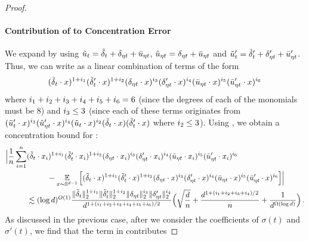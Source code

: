 \begin{proof}
\paragraph{Contribution of  to Concentration Error} We expand  by using $\tilde{u}_t = {\tilde{\delta}}_t + \delta_{\eta t} + \bar{u}_{\eta t}$, $\hat{u}_{\eta t} = \delta_{\eta t} + \bar{u}_{\eta t}$ and $\tilde{u}_t' = {\tilde{\delta}}_t' + \delta_{\eta t}' + \bar{u}_{\eta t}'$. Thus, we can write  as a linear combination of terms of the form
\begin{align} \label{eq:single_term_type1_simplified}
({\tilde{\delta}}_t \cdot x)^{1 + i_{1}} ({\tilde{\delta}}_t' \cdot x)^{1 + i_{2}} (\delta_{\eta t} \cdot x)^{i_{3}} (\delta_{\eta t}' \cdot x)^{i_{4}} (\bar{u}_{\eta t} \cdot x)^{i_{5}} (\bar{u}_{\eta t}' \cdot x)^{i_{6}}
\end{align}
where $i_{1} + i_{2} + i_{3} + i_{4} + i_{5} + i_{6} = 6$ (since the degrees of each of the monomials must be $8$) and $i_{3} \leq 3$ (since each of these terms originates from $(\tilde{u}_t' \cdot x)^{i_{3}} (\hat{u}_{\eta t}' \cdot x)^{i_{4}} (\tilde{u}_t \cdot x)^{i_{2}} ({\tilde{\delta}}_t \cdot x) ({\tilde{\delta}}_t' \cdot x)$ where $i_{2} \leq 3$). Using , we obtain a concentration bound for :
\begin{align} \label{eq:type1_concentration_error}
\Big|\frac{1}{n} \sum_{i = 1}^n & ({\tilde{\delta}}_t \cdot x_i)^{1 + i_{1}} ({\tilde{\delta}}_t' \cdot x_i)^{1 + i_{2}} (\delta_{\eta t} \cdot x_i)^{i_{3}} (\delta_{\eta t}' \cdot x_i)^{i_{4}} (\bar{u}_{\eta t} \cdot x_i)^{i_{5}} (\bar{u}_{\eta t}' \cdot x_i)^{i_{6}} \\
& \,\,\,\,\,\,\,\,\,\,\,\,\,\,\,\, - \operatorname*{\mathbb{E}}_{x \sim \mathbb{S}^{d - 1}} \Big[({\tilde{\delta}}_t \cdot x)^{1 + i_{1}} ({\tilde{\delta}}_t' \cdot x)^{1 + i_{2}} (\delta_{\eta t} \cdot x)^{i_{3}} (\delta_{\eta t}' \cdot x)^{i_{4}} (\bar{u}_{\eta t} \cdot x)^{i_{5}} (\bar{u}_{\eta t}' \cdot x)^{i_{6}}\Big] \Big| \\
& \lesssim (\log d)^{O(1)} \frac{\|{\tilde{\delta}}_t\|_2^{1 + i_{1}} \|{\tilde{\delta}}_t'\|_2^{1 + i_{2}} \|\delta_{\eta t}\|_2^{i_{3}} \|\delta_{\eta t}'\|_2^{i_{4}}}{d^{1 + (i_{1} + i_{2} + i_{3} + i_{4} + i_{5} + i_{6})/2}} \Big(\sqrt{\frac{d}{n}} + \frac{d^{1 + (i_{1} + i_{2} + i_{3} + i_{4})/2}}{n} + \frac{1}{d^{\Omega(\log d)}} \Big) \,.
\end{align}
As discussed in the previous case, after we consider the coefficients of $\sigma(t)$ and $\sigma'(t)$, we find that the term in  contributes

\end{proof}
